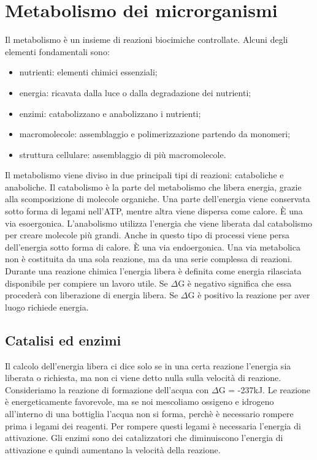 \chapter{Metabolismo dei microrganismi}
Il metabolismo \`e un insieme di reazioni biocimiche controllate. Alcuni degli elementi fondamentali sono:
\begin{itemize}
    \item nutrienti: elementi chimici essenziali; 
    \item energia: ricavata dalla luce o dalla degradazione dei nutrienti;
    \item enzimi: catabolizzano e anabolizzano i nutrienti;
    \item macromolecole: assemblaggio e polimerizzazione partendo da monomeri; 
    \item struttura cellulare: assemblaggio di pi\`u macromolecole. 
\end{itemize}
Il metabolismo viene diviso in due principali tipi di reazioni: cataboliche e anaboliche. 
Il catabolismo \`e la parte del metabolismo che libera energia, grazie alla scomposizione di molecole organiche. Una parte dell'energia viene conservata sotto forma di legami nell'ATP, mentre altra viene dispersa come calore. \`E una via esoergonica.
L'anabolismo utilizza l'energia che viene liberata dal catabolismo per creare molecole pi\`u grandi. Anche in questo tipo di processi viene persa dell'energia sotto forma di calore. \`E una via endoergonica.
Una via metabolica non \`e costituita da una sola reazione, ma da una serie complessa di reazioni. Durante una reazione chimica l'energia libera \`e definita come energia rilasciata disponibile per compiere un lavoro utile. 
Se ${\Delta}$G \`e negativo significa che essa proceder\`a con liberazione di energia libera.
Se ${\Delta}$G \`e positivo la reazione per aver luogo richiede energia.
\section{Catalisi ed enzimi}
Il calcolo dell'energia libera ci dice solo se in una certa reazione l'energia sia liberata o richiesta, ma non ci viene detto nulla sulla velocit\`a di reazione.
Consideriamo la reazione di formazione dell'acqua con ${\Delta}$G = -237kJ. Le reazione \`e energeticamente favorevole, ma se noi mescoliamo ossigeno e idrogeno all'interno di una bottiglia l'acqua non si forma, perch\`e \`e necessario rompere prima i legami dei reagenti. Per rompere questi legami \`e necessaria l'energia di attivazione. Gli enzimi sono dei catalizzatori che diminuiscono l'energia di attivazione e quindi aumentano la velocit\`a della reazione.
